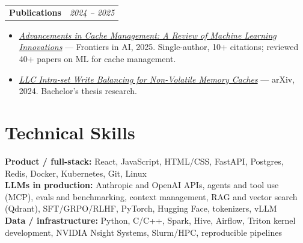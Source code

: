 \documentclass[10pt,letterpaper]{article}
\makeatletter
\newcommand{\project}[2]{%
  \begin{tabularx}{\textwidth}{@{}Xr@{}}
    \textbf{#1} & \textit{#2}
  \end{tabularx}\vspace{-0.25em}
}
\makeatother
\begin{document}
\vspace{0.75em}
\project{Publications}{2024 -- 2025}
\begin{itemize}
  \item \href{https://www.frontiersin.org/journals/artificial-intelligence/articles/10.3389/frai.2025.1441250/full}{\textit{Advancements in Cache Management: A Review of Machine Learning Innovations}} --- Frontiers in AI, 2025. Single-author, 10+ citations; reviewed 40+ papers on ML for cache management.
  \item \href{https://arxiv.org/abs/2410.15344}{\textit{LLC Intra-set Write Balancing for Non-Volatile Memory Caches}} --- arXiv, 2024. Bachelor's thesis research.
\end{itemize}

\section{Technical Skills}

\textbf{Product / full-stack:} React, JavaScript, HTML/CSS, FastAPI, Postgres, Redis, Docker, Kubernetes, Git, Linux\\
\textbf{LLMs in production:} Anthropic and OpenAI APIs, agents and tool use (MCP), evals and benchmarking, context management, RAG and vector search (Qdrant), SFT/GRPO/RLHF, PyTorch, Hugging Face, tokenizers, vLLM\\
\textbf{Data / infrastructure:} Python, C/C++, Spark, Hive, Airflow, Triton kernel development, NVIDIA Nsight Systems, Slurm/HPC, reproducible pipelines
\end{document}

